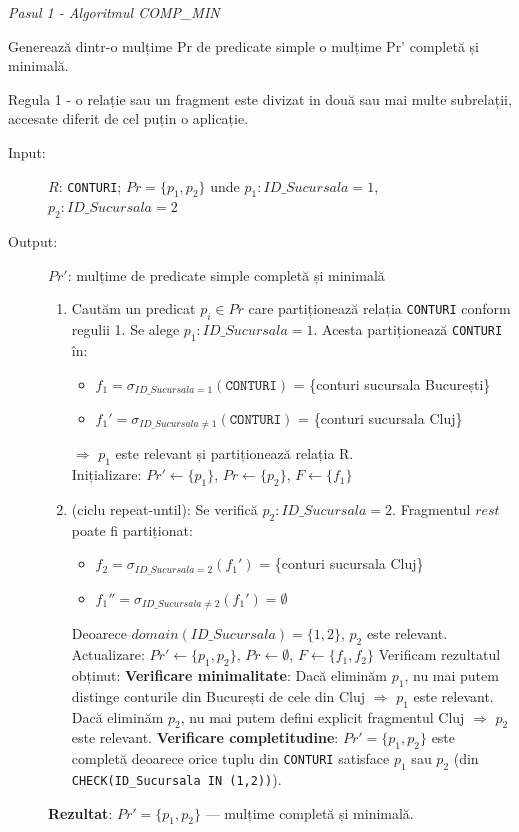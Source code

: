\documentclass[12pt,a4paper]{article}
\begin{document}
\textit{Pasul 1 - Algoritmul COMP\_MIN}

Generează dintr-o mulțime Pr de predicate simple o mulțime Pr' completă și minimală.

Regula 1 - o relație sau un fragment este divizat in două sau mai multe subrelații, accesate diferit de cel puțin o aplicație.

\begin{description}
  \item[Input:] $R$: \texttt{CONTURI}; \quad $Pr = \{p_1, p_2\}$ unde $p_1: ID\_Sucursala=1$, $p_2: ID\_Sucursala=2$
  \item[Output:] $Pr'$: mulțime de predicate simple completă și minimală
    \begin{enumerate}
      \item Cautăm un predicat $p_i \in Pr$ care partiționează relația \texttt{CONTURI} conform regulii 1. Se alege $p_1: ID\_Sucursala=1$. Acesta partiționează \texttt{CONTURI} în:
        \begin{itemize}
          \item $f_1 = \sigma_{ID\_Sucursala=1}(\texttt{CONTURI})$ = \{conturi sucursala București\}
          \item $f_1' = \sigma_{ID\_Sucursala \neq 1}(\texttt{CONTURI})$ = \{conturi sucursala Cluj\}
        \end{itemize}
        $\Rightarrow$ $p_1$ este relevant și partiționează relația R. \\
        Inițializare:
        $Pr' \leftarrow \{p_1\}$, $Pr \leftarrow \{p_2\}$, $F \leftarrow \{f_1\}$
      \item (ciclu repeat-until): Se verifică $p_2: ID\_Sucursala=2$. Fragmentul $rest$ poate fi partiționat:
        \begin{itemize}
          \item $f_2 = \sigma_{ID\_Sucursala=2}(f_1')$ = \{conturi sucursala Cluj\}
          \item $f_1'' = \sigma_{ID\_Sucursala \neq 2}(f_1') = \emptyset$
        \end{itemize}
        Deoarece $domain(ID\_Sucursala) = \{1,2\}$, $p_2$ este relevant. \\
        Actualizare:
        $Pr' \leftarrow \{p_1, p_2\}$, $Pr \leftarrow \emptyset$, $F \leftarrow \{f_1, f_2\}$
        Verificam rezultatul obținut:
        \textbf{Verificare minimalitate}: Dacă eliminăm $p_1$, nu mai putem distinge conturile din București de cele din Cluj $\Rightarrow$ $p_1$ este relevant. Dacă eliminăm $p_2$, nu mai putem defini explicit fragmentul Cluj $\Rightarrow$ $p_2$ este relevant.
        \textbf{Verificare completitudine}: $Pr' = \{p_1, p_2\}$ este completă deoarece orice tuplu din \texttt{CONTURI} satisface $p_1$ sau $p_2$ (din \texttt{CHECK(ID\_Sucursala IN (1,2))}).
    \end{enumerate}
    \textbf{Rezultat}: $Pr' = \{p_1, p_2\}$ — mulțime completă și minimală.
\end{description}
\end{document}
